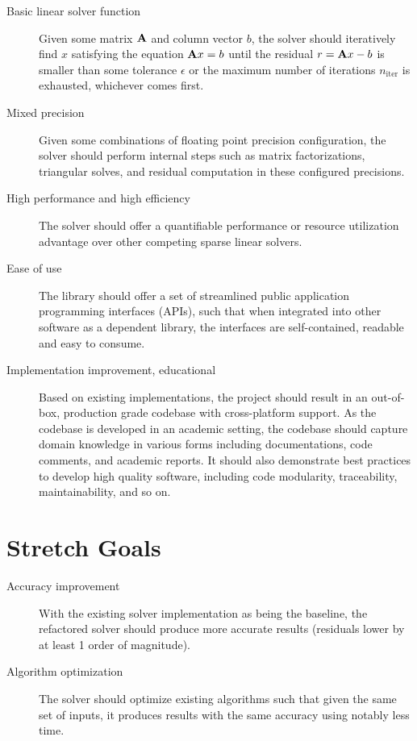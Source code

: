 \documentclass{article}
\begin{document}
\begin{description}
\item[Basic linear solver function] Given some matrix \(\mathbf{A}\) and column
  vector \(b\), the solver should iteratively find \(x\) satisfying the equation
  \(\mathbf{A}x = b\) until the residual \(r = \mathbf{A}x - b\) is smaller than
  some tolerance \(\epsilon\) or the maximum number of iterations
  \(n_\mathrm{iter}\) is exhausted, whichever comes first.
\item[Mixed precision] Given some combinations of floating point precision
  configuration, the solver should perform internal steps such as matrix
  factorizations, triangular solves, and residual computation in these
  configured precisions.
\item[High performance and high efficiency] The solver should offer a quantifiable
  performance or resource utilization advantage over other competing sparse
  linear solvers.
\item[Ease of use] The library should offer a set of streamlined public application
  programming interfaces (APIs), such that when integrated into other software
  as a dependent library, the interfaces are self-contained, readable and easy
  to consume.
\item[Implementation improvement, educational] Based on existing implementations,
  the project should result in an out-of-box, production grade codebase with
  cross-platform support. As the codebase is developed in an academic setting,
  the codebase should capture domain knowledge in various forms including
  documentations, code comments, and academic reports. It should also
  demonstrate best practices to develop high quality software, including code
  modularity, traceability, maintainability, and so on.
\end{description}

\section{Stretch Goals}

\begin{description}
\item[Accuracy improvement] With the existing solver implementation
  as being the baseline, the refactored solver should produce more accurate
  results (residuals lower by at least 1 order of magnitude).
\item[Algorithm optimization] The solver should optimize existing algorithms such
  that given the same set of inputs, it produces results with the same accuracy
  using notably less time.
\end{description}
\end{document}
